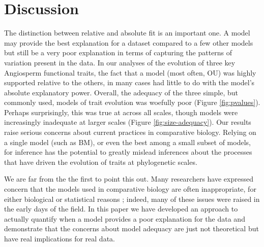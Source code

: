 \documentclass[a4paper,12pt]{article}
\begin{document}
\section{Discussion}


The distinction between relative and absolute fit is an important one. A model may provide the best explanation for a dataset compared to a few other models but still be a very poor explanation in terms of capturing the patterns of variation present in the data. 
In our analyses of the evolution of three key Angiosperm functional traits, the fact that a model (most often, OU) was highly supported relative to the others, in many cases had little to do with the model's absolute explanatory power. Overall, the adequacy of the three simple, but commonly used, models of trait evolution was woefully poor (Figure \ref{fig:pvalues}). Perhaps surprisingly, this was true at across all scales, though models were increasingly inadequate at larger scales (Figure \ref{fig:size-adequacy}). Our results raise serious concerns about current practices in comparative biology. Relying on a single model (such as BM), or even the best among a small subset of models, for inference has the potential to greatly mislead inferences about the processes that have driven the evolution of traits at phylogenetic scales.

We are far from the the first to point this out. Many researchers have expressed concern that the models used in comparative biology are often inappropriate, for either biological or statistical reasons \citep{Felsenstein1985, Felsenstein1988, HarveyPagel1991, Garland1992, Pagel1993, Diaz1996, HansenMartins1996, Price1997, Garland1999, GarlandIves2000, HansenOrzack2005, Hansen2012, Felsenstein2012, Boettiger2012, SlaterPennell}; indeed, many of these issues were raised in the early days of the field.
In this paper we have developed an approach to actually quantify when a model provides a poor explanation for the data and demonstrate that the concerns about model adequacy are just not theoretical but have real implications for real data.
\end{document}
